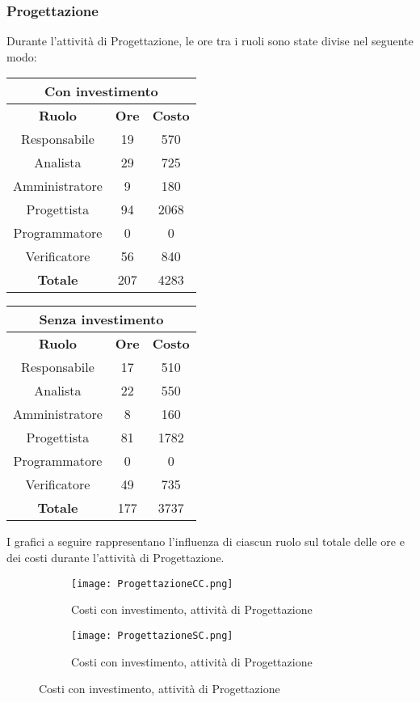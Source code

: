 \documentclass{scalatekids-article}
\begin{document}
\subsubsection{Progettazione}
Durante l'attività di Progettazione, le ore tra i ruoli sono state divise nel seguente modo:
\begin{center}
  \normalsize
  \begin{tabular}{| c | c | c |}
    \hline
    \multicolumn{3}{|c|}{\textbf{Con investimento}}\\
    \hline
    \textbf{Ruolo} & \textbf{Ore} & \textbf{Costo}\\
    \hline
    Responsabile & 19 & 570 \\
    Analista & 29 & 725 \\
    Amministratore & 9 & 180 \\
    Progettista & 94 & 2068\\
    Programmatore & 0 & 0\\
    Verificatore & 56 & 840 \\
    \hline
    \textbf{Totale} & 207 & 4283\\
    \hline
  \end{tabular}
  \qquad
  \begin{tabular}{| c | c | c |}
    \hline
    \multicolumn{3}{|c|}{\textbf{Senza investimento}}\\
    \hline
    \textbf{Ruolo} & \textbf{Ore} & \textbf{Costo}\\
    \hline
    Responsabile & 17 & 510\\
    Analista & 22 & 550\\
    Amministratore & 8 & 160\\
    Progettista & 81 & 1782\\
    Programmatore & 0 & 0\\
    Verificatore & 49 & 735\\
    \hline
    \textbf{Totale} & 177 & 3737 \\
    \hline
  \end{tabular}
\end{center}
I grafici a seguire rappresentano l'influenza di ciascun ruolo sul totale delle ore e dei costi durante l'attività di Progettazione.
\begin{figure}[H]
  \begin{subfigure}[H]{0.47\textwidth}
    \texttt{[image: ProgettazioneCC.png]}
    \caption{Costi con investimento, attività di Progettazione}
  \end{subfigure}
  \qquad
  \begin{subfigure}[H]{0.47\textwidth}
    \texttt{[image: ProgettazioneSC.png]}
    \caption{Costi con investimento, attività di Progettazione}
  \end{subfigure}
\end{figure}
\newpage
\end{document}
